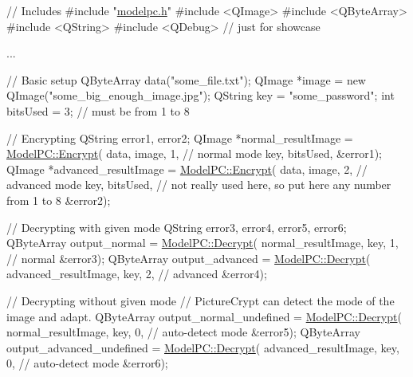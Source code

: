 \begin{DoxyCode}
\textcolor{comment}{// Includes}
\textcolor{preprocessor}{#include "\hyperlink{modelpc_8h}{modelpc.h}"}
\textcolor{preprocessor}{#include <QImage>}
\textcolor{preprocessor}{#include <QByteArray>}
\textcolor{preprocessor}{#include <QString>}
\textcolor{preprocessor}{#include <QDebug>} \textcolor{comment}{// just for showcase}

...

\textcolor{comment}{// Basic setup}
QByteArray data(\textcolor{stringliteral}{"some\_file.txt"});
QImage *image = \textcolor{keyword}{new} QImage(\textcolor{stringliteral}{"some\_big\_enough\_image.jpg"});
QString key = \textcolor{stringliteral}{"some\_password"};
\textcolor{keywordtype}{int} bitsUsed = 3; \textcolor{comment}{// must be from 1 to 8}

\textcolor{comment}{// Encrypting}
QString error1, error2;
QImage *normal\_resultImage = \hyperlink{class_model_p_c_a271cf9285e32df58ffbfc918e6482bbd}{ModelPC::Encrypt}(
    data,
    image,
    1, \textcolor{comment}{// normal mode}
    key,
    bitsUsed,
    &error1);
QImage *advanced\_resultImage = \hyperlink{class_model_p_c_a271cf9285e32df58ffbfc918e6482bbd}{ModelPC::Encrypt}(
    data,
    image,
    2, \textcolor{comment}{// advanced mode}
    key,
    bitsUsed, \textcolor{comment}{// not really used here, so put here any number from 1 to 8}
    &error2);

\textcolor{comment}{// Decrypting with given mode}
QString error3, error4, error5, error6;
QByteArray output\_normal = \hyperlink{class_model_p_c_a902abaea4f07995b48c0f2fea6eceb7c}{ModelPC::Decrypt}(
    normal\_resultImage,
    key,
    1, \textcolor{comment}{// normal}
    &error3);
QByteArray output\_advanced = \hyperlink{class_model_p_c_a902abaea4f07995b48c0f2fea6eceb7c}{ModelPC::Decrypt}(
    advanced\_resultImage,
    key,
    2, \textcolor{comment}{// advanced}
    &error4);

\textcolor{comment}{// Decrypting without given mode}
\textcolor{comment}{// PictureCrypt can detect the mode of the image and adapt.}
QByteArray output\_normal\_undefined = \hyperlink{class_model_p_c_a902abaea4f07995b48c0f2fea6eceb7c}{ModelPC::Decrypt}(
    normal\_resultImage,
    key,
    0, \textcolor{comment}{// auto-detect mode}
    &error5);
QByteArray output\_advanced\_undefined = \hyperlink{class_model_p_c_a902abaea4f07995b48c0f2fea6eceb7c}{ModelPC::Decrypt}(
    advanced\_resultImage,
    key,
    0, \textcolor{comment}{// auto-detect mode}
    &error6);


\end{DoxyCode}
